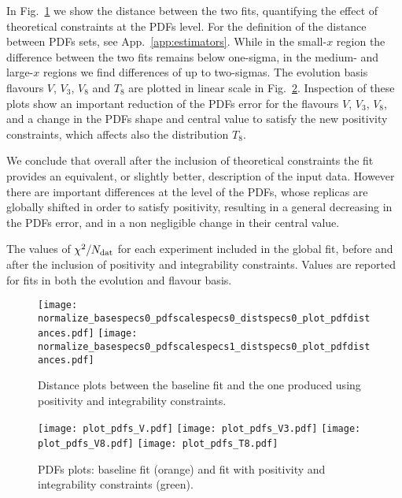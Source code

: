 %
In Fig.~\ref{fig:distances} we show the distance between the two fits, quantifying the effect of theoretical
constraints at the PDFs level. For the definition of the distance between PDFs sets, see App.~\ref{app:estimators}.
While in the small-$x$ region the difference between the two fits remains below 
one-sigma, in the medium- and large-$x$ regions we find differences of up to
two-sigmas. The evolution basis flavours $V$, $V_3$, $V_8$ and $T_8$ are plotted in linear scale in Fig.~\ref{fig:pdfs_plots}.
Inspection of these plots show an important reduction of the PDFs error for the flavours $V$, $V_3$, $V_8$,
and a change in the PDFs shape and central value to satisfy the new positivity constraints, which affects also the distribution
$T_8$.

%
We conclude that overall after the inclusion of theoretical constraints the fit provides an equivalent,
or slightly better, description of the input data. However there are important differences at the level of the PDFs,
whose replicas are globally shifted in order to satisfy positivity, resulting in a general decreasing in the PDFs error,
and in a non negligible change in their central value.

\begin{table}[htbp!]
    \centering
    
    \caption{The values of $\chi^2/N_{\rm dat}$ for each experiment included in the global fit, before and
    after the inclusion of positivity and integrability constraints. Values are reported for fits in both the evolution and flavour 
    basis.}
    \label{tab:experiments_chi2}
\end{table}

\begin{figure}[t!]
    \begin{center}
        \texttt{[image: normalize\_basespecs0\_pdfscalespecs0\_distspecs0\_plot\_pdfdistances.pdf]}
        \texttt{[image: normalize\_basespecs0\_pdfscalespecs1\_distspecs0\_plot\_pdfdistances.pdf]}
        \caption{Distance plots between the baseline fit and the one produced using positivity and integrability
        constraints.} 
        \label{fig:distances} 
    \end{center}
\end{figure}

\begin{figure}[t!]
    \begin{center}
        \texttt{[image: plot\_pdfs\_V.pdf]}
        \texttt{[image: plot\_pdfs\_V3.pdf]}
        \texttt{[image: plot\_pdfs\_V8.pdf]}
        \texttt{[image: plot\_pdfs\_T8.pdf]}
        \caption{PDFs plots: baseline fit (orange) and fit with positivity and integrability constraints (green).} 
        \label{fig:pdfs_plots} 
    \end{center}
\end{figure}


